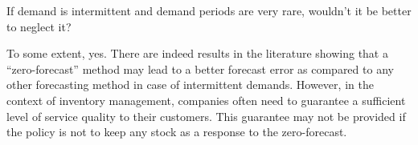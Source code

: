 \begin{question}
If demand is intermittent and demand periods are very rare, wouldn't it be better to neglect it?

  \begin{solution}
  To some extent, yes. There are indeed results in the literature showing that a ``zero-forecast'' method may lead to a better forecast error as compared to any other forecasting method in case of intermittent demands. However, in the context of inventory management, companies often need to guarantee a sufficient level of service quality to their customers. This guarantee may not be provided if the policy is not to keep any stock as a response to the zero-forecast.
  \end{solution}
\end{question}

